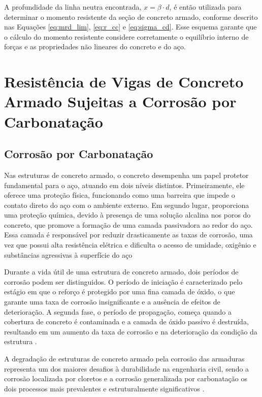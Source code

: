 A profundidade da linha neutra encontrada, $x = \beta \cdot d$, é então utilizada para determinar o momento resistente da seção de concreto armado, conforme descrito nas Equações \eqref{eq:mrd_lim}, \eqref{eq:r_cc} e \eqref{eq:sigma_cd}. Esse esquema garante que o cálculo do momento resistente considere corretamente o equilíbrio interno de forças e as propriedades não lineares do concreto e do aço.


\section{Resistência de Vigas de Concreto Armado Sujeitas a Corrosão por Carbonatação}


\subsection{Corrosão por Carbonatação}

Nas estruturas de concreto armado, o concreto desempenha um papel protetor fundamental para o aço, atuando em dois níveis distintos. Primeiramente, ele oferece uma proteção física, funcionando como uma barreira que impede o contato direto do aço com o ambiente externo. Em segundo lugar, proporciona uma proteção química, devido à presença de uma solução alcalina nos poros do concreto, que promove a formação de uma camada passivadora ao redor do aço. Essa camada é responsável por reduzir drasticamente as taxas de corrosão, uma vez que possui alta resistência elétrica e dificulta o acesso de umidade, oxigênio e substâncias agressivas à superfície do aço \cite{PaziniMeira2012}

Durante a vida útil de uma estrutura de concreto armado, dois períodos de corrosão podem ser distinguidos. O período de iniciação é caracterizado pelo estágio em que o reforço é protegido por uma fina camada de óxido, o que garante uma taxa de corrosão insignificante e a ausência de efeitos de deterioração. A segunda fase, o período de propagação, começa quando a cobertura de concreto é contaminada e a camada de óxido passivo é destruída, resultando em um aumento da taxa de corrosão e na deterioração da condição da estrutura \cite{cavaco_reliabilitybased_2017}.

A degradação de estruturas de concreto armado pela corrosão das armaduras representa um dos maiores desafios à durabilidade na engenharia civil, sendo a corrosão localizada por cloretos e a corrosão generalizada por carbonatação os dois processos mais prevalentes e estruturalmente significativos \cite{helene_p_r_l_concreto_1993}.  

